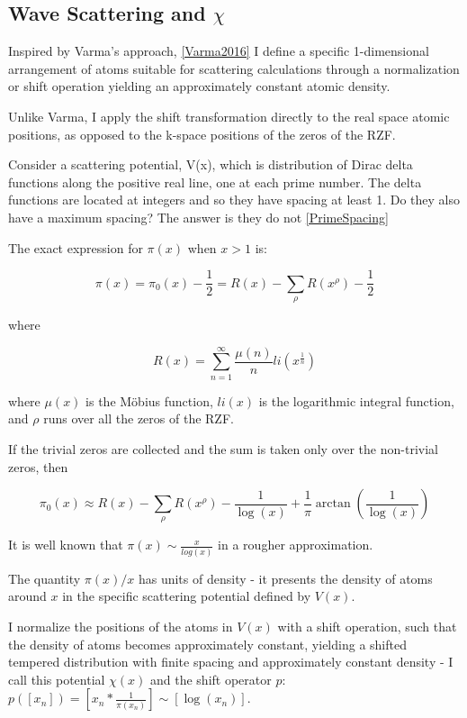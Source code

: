 \documentclass[11pt, oneside]{article}   	%
\begin{document}
\subsection{Wave Scattering and $\chi$}
Inspired by Varma's approach, \ref{Varma2016} I define a specific 1-dimensional arrangement of atoms suitable for scattering calculations through a normalization or shift operation yielding an approximately constant atomic density.

Unlike Varma, I apply the shift transformation directly to the real space atomic positions, as opposed to the k-space positions of the zeros of the RZF.

Consider a scattering potential, V(x), which is distribution of Dirac delta functions along the positive real line, one at each prime number. 
The delta functions are located at integers and so they have spacing at least 1.
Do they also have a maximum spacing? The answer is they do not \ref{PrimeSpacing}

The exact expression \cite{Riemann} for $\pi(x)$ when $x>1$ is:

\begin{equation}
\pi(x) = \pi_0(x) - \frac{1}{2} = R(x) - \sum_{\rho}R(x^{\rho}) - \frac{1}{2}
\end{equation}

where

\begin{equation}
R(x) = \sum_{n=1}^{\infty}\frac{\mu(n)}{n}li(x^{\frac{1}{n}})
\end{equation}

where $\mu(x)$ is the M\"obius function, $li(x)$ is the logarithmic integral function, and $\rho$ runs over all the zeros of the RZF.

If the trivial zeros are collected and the sum is taken only over the non-trivial zeros, then

\begin{equation}
\pi_0(x) \approx R(x) - \sum_{\rho}R(x^{\rho}) - \frac{1}{\log(x)} + \frac{1}{\pi}\arctan(\frac{1}{\log(x)})
\end{equation}
 
It is well known that $\pi(x) \sim \frac{x}{log(x)}$ in a rougher approximation.

The quantity $\pi(x)/x$ has units of density - it presents the density of atoms around $x$ in the specific scattering potential defined by $V(x)$.

I normalize the positions of the atoms in $V(x)$ with a shift operation, such that the density of atoms becomes approximately constant, yielding a shifted tempered distribution with finite spacing and approximately constant density - I call this potential $\chi(x)$ and the shift operator $p$: $p([x_n]) = [x_n * \frac{1}{\pi(x_n)}] \sim [\log(x_n)]$.
\end{document}
